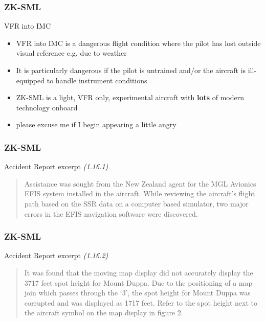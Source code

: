 \begin{frame}
\frametitle{ZK-SML}
\begin{block}{VFR into IMC}
\begin{itemize}
\item<1-> VFR into IMC is a dangerous flight condition where the pilot has lost outside visual reference e.g. due to weather
\item<2-> It is particularly dangerous if the pilot is untrained and/or the aircraft is ill-equipped to handle instrument conditions
\item<3-> ZK-SML is a light, VFR only, experimental aircraft with \textbf{lots} of modern technology onboard
\item<4-> \tiny{please excuse me if I begin appearing a little angry}
\end{itemize}
\end{block}
\end{frame}

\begin{frame}
\frametitle{ZK-SML}
\begin{block}{Accident Report excerpt \tiny{\emph{(1.16.1)}}}
\begin{quote}
Assistance was sought from the New Zealand agent for the MGL Avionics EFIS system installed in the aircraft.  While reviewing the aircraft's flight path based on the SSR data on a computer based simulator, two major errors in the EFIS navigation software were discovered. 
\end{quote}
\end{block}
\end{frame}

\begin{frame}
\frametitle{ZK-SML}
\begin{block}{Accident Report excerpt \tiny{\emph{(1.16.2)}}}
\begin{quote}
It was found that the moving map display did not accurately display the 3717 feet spot height for Mount Duppa.  Due to the positioning of a map join which passes through the `3', the spot height for Mount Duppa was corrupted and was displayed as 1717 feet.  Refer to the spot height next to the aircraft symbol on the map display in figure 2. 
\end{quote}
\end{block}
\end{frame}

